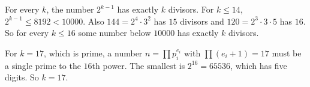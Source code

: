 For every $k$, the number $2^{k-1}$ has exactly $k$ divisors. For $k\le14$, $2^{k-1}\le8192<10000$. Also $144=2^4\cdot3^2$ has $15$ divisors and $120=2^3\cdot3\cdot5$ has $16$. So for every $k\le16$ some number below $10000$ has exactly $k$ divisors.

For $k=17$, which is prime, a number $n=\prod p_i^{e_i}$ with $\prod(e_i+1)=17$ must be a single prime to the $16$th power. The smallest is $2^{16}=65536$, which has five digits. So $k=\boxed{17}$.

